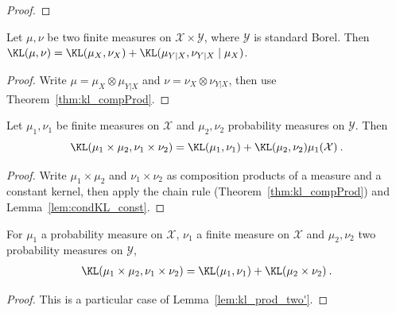 \begin{proof}%
{}

\end{proof}


\begin{theorem}
  \label{thm:kl_fst_add_condKL}
  \leanok
  Let $\mu, \nu$ be two finite measures on $\mathcal X \times \mathcal Y$, where $\mathcal Y$ is standard Borel.
  Then $\KL(\mu, \nu) = \KL(\mu_X, \nu_X) + \KL(\mu_{Y|X}, \nu_{Y|X} \mid \mu_X)$.
\end{theorem}

\begin{proof} \leanok
{}
Write $\mu = \mu_X \otimes \mu_{Y|X}$ and $\nu = \nu_X \otimes \nu_{Y|X}$, then use Theorem~\ref{thm:kl_compProd}.
\end{proof}


\begin{lemma}
  \label{lem:kl_prod_two'}
  \leanok
  Let $\mu_1, \nu_1$ be finite measures on $\mathcal X$ and $\mu_2, \nu_2$ probability measures on $\mathcal{Y}$. Then
  $$\KL(\mu_1\times \mu_2, \nu_1 \times \nu_2) = \KL(\mu_1, \nu_1) + \KL(\mu_2, \nu_2) \mu_1 (\mathcal X) \: .$$
\end{lemma}

\begin{proof} \leanok
{}
Write $\mu_1 \times \mu_2$ and $\nu_1 \times \nu_2$ as composition products of a measure and a constant kernel, then apply the chain rule (Theorem~\ref{thm:kl_compProd}) and Lemma~\ref{lem:condKL_const}.
\end{proof}
 

\begin{theorem}[Tensorization]
  \label{thm:kl_prod_two}
  \leanok
  For $\mu_1$ a probability measure on $\mathcal X$, $\nu_1$ a finite measure on $\mathcal{X}$ and $\mu_2, \nu_2$ two probability measures on $\mathcal Y$,
  \begin{align*}
  \KL(\mu_1 \times \mu_2, \nu_1 \times \nu_2) = \KL(\mu_1, \nu_1) + \KL(\mu_2 \times \nu_2) \: .
  \end{align*}
\end{theorem}

\begin{proof} \leanok
{}
This is a particular case of Lemma~\ref{lem:kl_prod_two'}.
\end{proof}


